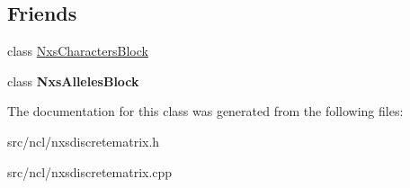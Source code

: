 \subsection*{Friends}
\begin{DoxyCompactItemize}
\item 
\hypertarget{classNxsDiscreteMatrix_ab9466d1b21f90b6fd961284f19c6e9d4}{
class \hyperlink{classNxsDiscreteMatrix_ab9466d1b21f90b6fd961284f19c6e9d4}{NxsCharactersBlock}}
\label{classNxsDiscreteMatrix_ab9466d1b21f90b6fd961284f19c6e9d4}

\item 
\hypertarget{classNxsDiscreteMatrix_ad9ba2bb6bba16b181df5d60f0c244681}{
class {\bfseries NxsAllelesBlock}}
\label{classNxsDiscreteMatrix_ad9ba2bb6bba16b181df5d60f0c244681}

\end{DoxyCompactItemize}


The documentation for this class was generated from the following files:\begin{DoxyCompactItemize}
\item 
src/ncl/nxsdiscretematrix.h\item 
src/ncl/nxsdiscretematrix.cpp\end{DoxyCompactItemize}
